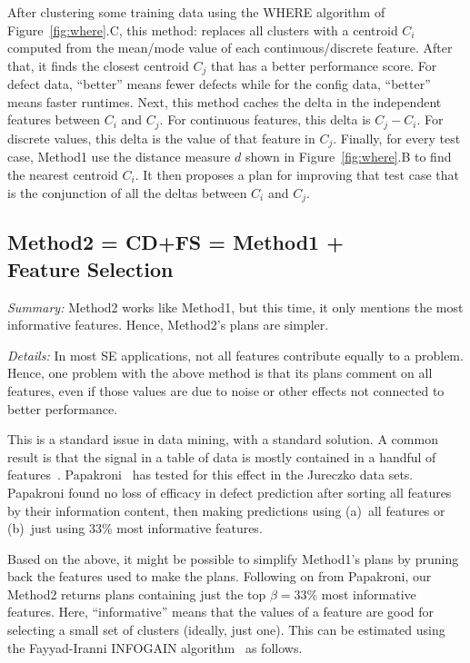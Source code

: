 \documentclass{sig-alternate}
\newcommand{\fig}[1]{Figure~\ref{fig:#1}}
\begin{document}
  

After clustering some training data using the WHERE algorithm of  \fig{where}.C, this method:
replaces all clusters with a  centroid $C_i$ computed from the mean/mode value of each
continuous/discrete feature. After that, it
finds the closest centroid $C_j$ that has a better
performance score. For defect data, ``better'' means fewer defects while for the config data,
``better'' means faster runtimes.
Next, this method caches the  delta in the independent features between $C_i$ and $C_j$. For continuous
features, this delta is $C_j - C_i$. For discrete values, this delta is the value of that feature
in $C_j$. 
Finally, for every test case, Method1 use the distance measure $d$ shown in \fig{where}.B to find
the nearest centroid $C_i$.  It then proposes a plan for improving that test case
that is the conjunction of all the deltas between $C_i$ and $C_j$.


\subsection{Method2 = CD+FS =  Method1  + \\Feature Selection }
 
{\em Summary:} Method2 works like Method1, but this time, it only mentions the most
informative features. Hence, Method2's plans are simpler.

{\em Details:} In most SE applications, not all features contribute equally to a problem.  Hence, one problem
with the above method is that its plans comment on all features, even if those values are due
to noise or other effects not connected to better performance.

This is a standard issue in data mining, with a standard solution.
A common result is that the signal in a table of data is mostly contained in a handful of features~\cite{hall03,kohavi97}.
Papakroni~\cite{papa13} has tested for this effect in the Jureczko data sets.
Papakroni found no loss of   efficacy in defect prediction after
sorting all features by their information content,
then making predictions using (a)~all  features or (b)~just using   33\% most informative features.

Based on the above, it might be possible to simplify Method1's plans by pruning back the features used to make
the plans. Following on from Papakroni, our Method2 returns plans
containing just the top $\beta=33\%$ most informative features. Here, ``informative'' means
that the values of a feature are good for selecting a small set of clusters (ideally,
just one).
This can be estimated using the Fayyad-Iranni INFOGAIN algorithm~\cite{FayIra93Multi}
as follows.
\end{document}
